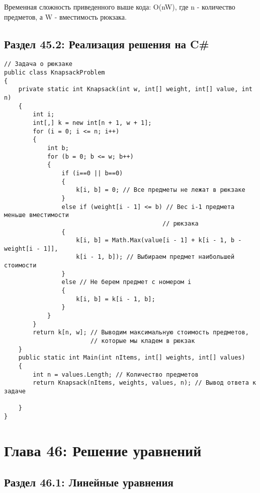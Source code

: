 \vspace{\baselineskip}
Временная сложность приведенного выше кода: O(nW), где n - количество предметов, а W - вместимость рюкзака.

\vspace{\baselineskip}
\section*{Раздел 45.2: Реализация решения на C\#}

\vspace{\baselineskip}
\begin{tcolorbox}
\begin{verbatim}
// Задача о рюкзаке
public class KnapsackProblem 
{
	private static int Knapsack(int w, int[] weight, int[] value, int n)    
	{        
		int i;        
		int[,] k = new int[n + 1, w + 1];        
		for (i = 0; i <= n; i++)        
		{            
			int b;            
			for (b = 0; b <= w; b++)            
			{                
				if (i==0 || b==0)                
				{                    
					k[i, b] = 0; // Все предметы не лежат в рюкзаке               
				}                
				else if (weight[i - 1] <= b) // Вес i-1 предмета меньше вместимости
				                            // рюкзака                
				{                    
					k[i, b] = Math.Max(value[i - 1] + k[i - 1, b - weight[i - 1]], 
					k[i - 1, b]); // Выбираем предмет наибольшей стоимости                
				}                
				else // Не берем предмет с номером i                
				{                    
					k[i, b] = k[i - 1, b];                
				}            
			}        
		}        
		return k[n, w]; // Выводим максимальную стоимость предметов, 
		                // которые мы кладем в рюкзак   
	}
	public static int Main(int nItems, int[] weights, int[] values)  
	{        
		int n = values.Length; // Количество предметов        
		return Knapsack(nItems, weights, values, n); // Вывод ответа к задаче
    
	} 
}
\end{verbatim}
\end{tcolorbox}

\chapter*{Глава 46: Решение уравнений}

\vspace{\baselineskip}
\section*{Раздел 46.1: Линейные уравнения}

